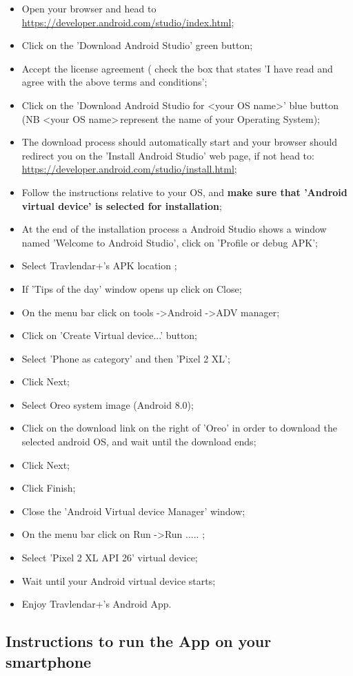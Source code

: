 \begin{itemize}
	\item Open your browser and head to \href{https://developer.android.com/studio/index.html}{\color{blue}https://developer.android.com/studio/index.html};
	\item Click on the 'Download Android Studio' green button;
	\item Accept the license agreement ( check the box that states 'I have read and agree with the above terms and conditions';
	\item Click on the 'Download Android Studio for \textless your OS name\textgreater' blue button (NB \textless your OS name\textgreater  \,represent the name of your Operating System);
	\item The download process should automatically start and your browser should redirect you on the 'Install Android Studio' web page, if not head to: \href{https://developer.android.com/studio/install.html}{\color{blue}https://developer.android.com/studio/install.html};
	\item Follow the instructions relative to your OS, and \textbf{make sure that 'Android virtual device' is selected for installation};
	\item At the end of the installation process a Android Studio shows a window named 'Welcome to Android Studio', click on 'Profile or debug APK';
	\item Select Travlendar+'s APK location ;
	\item If 'Tips of the day' window opens up click on Close;
	\item On the menu bar click on tools -\textgreater Android -\textgreater ADV manager;
	\item Click on 'Create Virtual device...' button;
	\item Select 'Phone as category' and then 'Pixel 2 XL';
	\item Click Next;
	\item Select Oreo system image (Android 8.0);
	\item Click on the download link on the right of 'Oreo' in order to download the selected android OS, and wait until the download ends; 
	\item Click Next;
	\item Click Finish;
	\item Close the 'Android Virtual device Manager' window;
	\item On the menu bar click on Run -\textgreater Run ..... ;
	\item Select 'Pixel 2 XL API 26' virtual device;
	\item Wait until your Android virtual device starts;
	\item Enjoy Travlendar+'s Android App.	
\end{itemize}

\subsection{Instructions to run the App on your smartphone}
\label{subsect:Smartphone Instructions}
